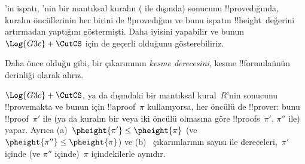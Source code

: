 



'in ispatı, 'nin bir mantıksal
kuralın (\RightR{\lexists} ile \LeftR{\lforall} dışında) sonucunu
!!{prove}{}dığında, kuralın öncüllerinin her birini de !!{prove}{}dığını ve
bunu ispatın !!{height}~değerini artırmadan yaptığını göstermişti. Daha iyisini
yapabilir ve bunun
$\Log{G3c} + \CutCS$ için de geçerli olduğunu gösterebiliriz.

Daha önce olduğu gibi, bir \CutCS{} çıkarımının \emph{kesme derecesini},
kesme !!{formula}{}ünün derinliği olarak alırız.

\begin{lem}
$\Log{G3c} + \CutCS$, \RightR{\lexists} ya da \LeftR{\lforall} dışındaki
bir mantıksal kural~$R$'nin sonucunu !!{prove}{}makta ve bunun için
!!a{proof}~$\pi$ kullanıyorsa, her öncülü de !!{prove}{}r: bunu
!!{proof}~$\pi'$ ile (ya da kuralın bir veya iki öncülü olmasına göre
!!{proof}s~$\pi'$, $\pi''$ ile) yapar.
Ayrıca (a)~$\pheight{\pi'}\le\pheight{\pi}$ (ve
$\pheight{\pi''}\le\pheight{\pi}$) ve (b)~\CutCS{} çıkarımlarının sayısı
ile dereceleri,~$\pi'$ içinde (ve $\pi''$ içinde)~$\pi$ içindekilerle
aynıdır.
\end{lem}

